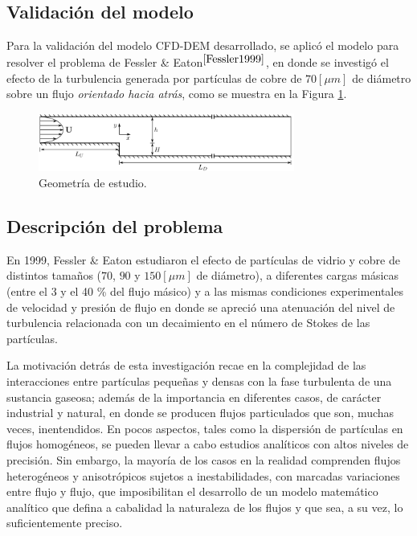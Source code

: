 \begin{center}
    \section{Validaci\'on del modelo} \label{validacion}
\end{center}

\noindent
\justify

Para la validaci\'on del modelo CFD-DEM desarrollado, se aplic\'o el modelo para resolver el problema de Fessler \& Eaton$^{\cite{Fessler1999}}$, en donde se investig\'o el efecto de la turbulencia generada por part\'iculas de cobre de $70 [\mu m]$ de di\'ametro sobre un flujo \textit{orientado hacia atr\'as}, como se muestra en la Figura \ref{problemaVal}.

\begin{figure}[h!]
    \centering
    \includegraphics[width=0.75\textwidth]{Images/Fessler.PNG}
    \caption{Geometr\'ia de estudio.}
    \label{problemaVal}
\end{figure}

\subsection{Descripci\'on del problema}

\noindent
\justify

En 1999, Fessler \& Eaton estudiaron el efecto de part\'iculas de vidrio y cobre de distintos tama\~nos ($70$, $90$ y $150 [\mu m]$ de di\'ametro), a diferentes cargas m\'asicas (entre el 3 y el 40 \% del flujo m\'asico) y a las mismas condiciones experimentales de velocidad y presi\'on de flujo en donde se apreci\'o una atenuaci\'on del nivel de turbulencia relacionada con un decaimiento en el n\'umero de Stokes de las part\'iculas.

\noindent
\justify

La motivaci\'on detr\'as de esta investigaci\'on recae en la complejidad de las interacciones entre part\'iculas peque\~nas y densas con la fase turbulenta de una sustancia gaseosa; adem\'as de la importancia en diferentes casos, de car\'acter industrial y natural, en donde se producen flujos particulados que son, muchas veces, inentendidos. En pocos aspectos, tales como la dispersi\'on de part\'iculas en flujos homog\'eneos, se pueden llevar a cabo estudios anal\'iticos con altos niveles de precisi\'on. Sin embargo, la mayor\'ia de los casos en la realidad comprenden flujos heterog\'eneos y anisotr\'opicos sujetos a inestabilidades, con marcadas variaciones entre flujo y flujo, que imposibilitan el desarrollo de un modelo matem\'atico anal\'itico que defina a cabalidad la naturaleza de los flujos y que sea, a su vez, lo suficientemente preciso. 

